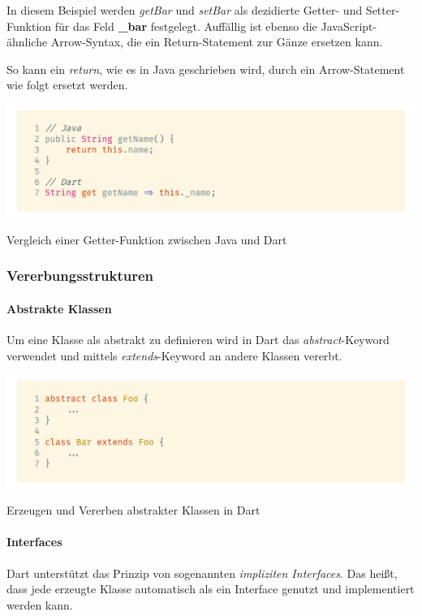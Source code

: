 In diesem Beispiel werden \textit{getBar} und \textit{setBar} als dezidierte Getter- und Setter-Funktion für das Feld \textbf{\_bar} festgelegt. Auffällig ist ebenso die JavaScript-ähnliche Arrow-Syntax, die ein Return-Statement zur Gänze ersetzen kann.

So kann ein \textit{return}, wie es in Java geschrieben wird, durch ein Arrow-Statement wie folgt
ersetzt werden.

\begin{code}[h]
    \centering
    \includegraphics[width=1\textwidth]{images/Dart/theory/dartVSJavaGetter.png}
    \vspace{-25pt}
    \caption{Vergleich einer Getter-Funktion zwischen Java und Dart}
\end{code}

\subsubsection{Vererbungsstrukturen}

\paragraph{Abstrakte Klassen}


Um eine Klasse als abstrakt zu definieren wird in Dart das \textit{abstract}-Keyword verwendet und mittels
\textit{extends}-Keyword an andere Klassen vererbt.

\begin{code}[h]
    \centering
    \includegraphics[width=1\textwidth]{images/Dart/theory/dartAbstractClass.png}
    \vspace{-25pt}
    \caption{Erzeugen und Vererben abstrakter Klassen in Dart}
\end{code}

\paragraph{Interfaces}
 

Dart unterstützt das Prinzip von sogenannten \textit{impliziten Interfaces}. Das heißt, dass jede erzeugte Klasse automatisch als ein Interface genutzt und implementiert werden kann.
